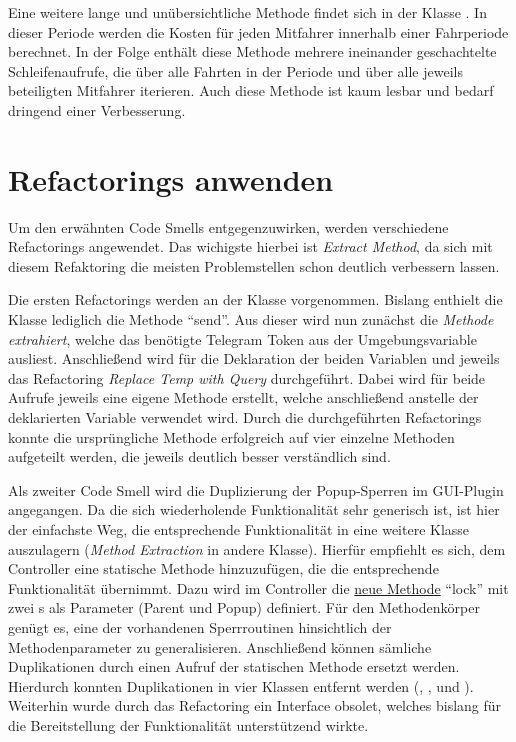 Eine weitere lange und unübersichtliche Methode findet sich in der Klasse \href{https://github.com/yschiebelhut/carpool-java/blob/379784c1ffe99a3f4fc15f393e12661479e6a4bf/3-carpool-java-domain/src/main/java/model/Fahrperiode.java#L85}{}.
In dieser Periode werden die Kosten für jeden Mitfahrer innerhalb einer Fahrperiode berechnet.
In der Folge enthält diese Methode mehrere ineinander geschachtelte Schleifenaufrufe, die über alle Fahrten in der Periode und über alle jeweils beteiligten Mitfahrer iterieren.
Auch diese Methode ist kaum lesbar und bedarf dringend einer Verbesserung.

\section{Refactorings anwenden}
Um den erwähnten Code Smells entgegenzuwirken, werden verschiedene Refactorings angewendet.
Das wichigste hierbei ist \emph{Extract Method}, da sich mit diesem Refaktoring die meisten Problemstellen schon deutlich verbessern lassen.

Die ersten Refactorings werden an der Klasse \href{https://github.com/yschiebelhut/carpool-java/blob/93eebf7f30e394dcf7abcb044328bf6dbaf1823e/0-carpool-java-integration/src/main/java/telegram/Telegram.java}{} vorgenommen.
Bislang enthielt die Klasse lediglich die Methode \enquote{send}.
Aus dieser wird nun zunächst die \emph{Methode  extrahiert}, welche das benötigte Telegram Token aus der Umgebungsvariable ausliest.
Anschließend wird für die Deklaration der beiden Variablen  und  jeweils das Refactoring \emph{Replace Temp with Query} durchgeführt.
Dabei wird für beide Aufrufe jeweils eine eigene Methode erstellt, welche anschließend anstelle der deklarierten Variable verwendet wird.
Durch die durchgeführten Refactorings konnte die ursprüngliche Methode erfolgreich auf vier einzelne Methoden aufgeteilt werden, die jeweils deutlich besser verständlich sind.

Als zweiter Code Smell wird die Duplizierung der Popup-Sperren im GUI-Plugin angegangen.
Da die sich wiederholende Funktionalität sehr generisch ist, ist hier der einfachste Weg, die entsprechende Funktionalität in eine weitere Klasse auszulagern (\emph{Method Extraction} in andere Klasse).
Hierfür empfiehlt es sich, dem Controller eine statische Methode hinzuzufügen, die die entsprechende Funktionalität übernimmt.
Dazu wird im Controller die \href{https://github.com/yschiebelhut/carpool-java/blob/93eebf7f30e394dcf7abcb044328bf6dbaf1823e/0-carpool-java-plugin-ui/src/main/java/gui/Controller.java#L32}{neue Methode} \enquote{lock} mit zwei s als Parameter (Parent und Popup) definiert.
Für den Methodenkörper genügt es, eine der vorhandenen Sperrroutinen hinsichtlich der Methodenparameter zu generalisieren.
Anschließend können sämliche Duplikationen durch einen Aufruf der statischen Methode ersetzt werden.
Hierdurch konnten Duplikationen in vier Klassen entfernt werden (, ,  und ).
Weiterhin wurde durch das Refactoring ein Interface obsolet, welches bislang für die Bereitstellung der Funktionalität unterstützend wirkte.

